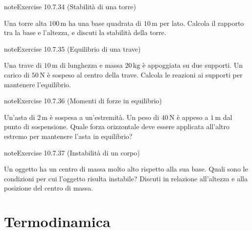 \documentclass[letterpaper,10pt,italian]{jupyterBook}
\begin{document}
\begin{sphinxadmonition}{note}{Exercise 10.7.34 (Stabilità di una torre)}



\sphinxAtStartPar
Una torre alta \(100 \, \text{m}\) ha una base quadrata di \(10 \, \text{m}\) per lato. Calcola il rapporto tra la base e l’altezza, e discuti la stabilità della torre.
\end{sphinxadmonition}
 \label{exercise:ch/mechanics/dynamics-problems-exercise-34}

\begin{sphinxadmonition}{note}{Exercise 10.7.35 (Equilibrio di una trave)}



\sphinxAtStartPar
Una trave di \(10 \, \text{m}\) di lunghezza e massa \(20 \, \text{kg}\) è appoggiata su due supporti. Un carico di \(50 \, \text{N}\) è sospeso al centro della trave. Calcola le reazioni ai supporti per mantenere l’equilibrio.
\end{sphinxadmonition}
 \label{exercise:ch/mechanics/dynamics-problems-exercise-35}

\begin{sphinxadmonition}{note}{Exercise 10.7.36 (Momenti di forze in equilibrio)}



\sphinxAtStartPar
Un’asta di \(2 \, \text{m}\) è sospesa a un’estremità. Un peso di \(40 \, \text{N}\) è appeso a \(1 \, \text{m}\) dal punto di sospensione. Quale forza orizzontale deve essere applicata all’altro estremo per mantenere l’asta in equilibrio?
\end{sphinxadmonition}
 \label{exercise:ch/mechanics/dynamics-problems-exercise-36}

\begin{sphinxadmonition}{note}{Exercise 10.7.37 (Instabilità di un corpo)}



\sphinxAtStartPar
Un oggetto ha un centro di massa molto alto rispetto alla sua base. Quali sono le condizioni per cui l’oggetto risulta instabile? Discuti in relazione all’altezza e alla posizione del centro di massa.
\end{sphinxadmonition}

\sphinxstepscope


\part{Termodinamica}
\end{document}
